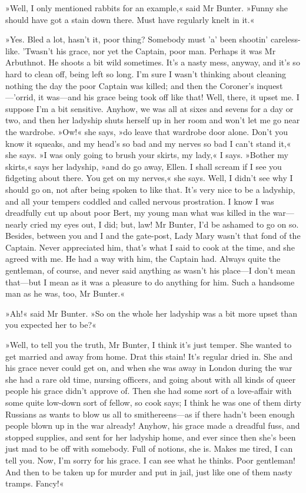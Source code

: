 »Well, I only mentioned rabbits for an example,« said Mr Bunter.  »Funny she should have got a stain down there. Must have regularly knelt in it.«

»Yes. Bled a lot, hasn't it, poor thing? Somebody must 'a' been shootin' careless-like. 'Twasn't his grace, nor yet the Captain, poor man. Perhaps it was Mr Arbuthnot. He shoots a bit wild sometimes.  It's a nasty mess, anyway, and it's so hard to clean off, being left so long. I'm sure I wasn't thinking about cleaning nothing the day the poor Captain was killed; and then the Coroner's inquest—'orrid, it was—and his grace being took off like that! Well, there, it upset me.  I suppose I'm a bit sensitive. Anyhow, we was all at sixes and sevens for a day or two, and then her ladyship shuts herself up in her room and won't let me go near the wardrobe. »Ow!« she says, »do leave that wardrobe door alone. Don't you know it squeaks, and my head's so bad and my nerves so bad I can't stand it,« she says. »I was only going to brush your skirts, my lady,« I says. »Bother my skirts,« says her ladyship, »and do go away, Ellen. I shall scream if I see you fidgeting about there. You get on my nerves,« she says. Well, I didn't see why I should go on, not after being spoken to like that. It's very nice to be a ladyship, and all your tempers coddled and called nervous prostration. I know I was dreadfully cut up about poor Bert, my young man what was killed in the war—nearly cried my eyes out, I did; but, law! Mr Bunter, I'd be ashamed to go on so. Besides, between you and I and the gate-post, Lady Mary wasn't that fond of the Captain. Never appreciated him, that's what I said to cook at the time, and she agreed with me. He had a way with him, the Captain had. Always quite the gentleman, of course, and never said anything as wasn't his place—I don't mean that—but I mean as it was a pleasure to do anything for him. Such a handsome man as he was, too, Mr Bunter.«

»Ah!« said Mr Bunter. »So on the whole her ladyship was a bit more upset than you expected her to be?«

»Well, to tell you the truth, Mr Bunter, I think it's just temper. She wanted to get married and away from home. Drat this stain! It's regular dried in. She and his grace never could get on, and when she was away in London during the war she had a rare old time, nursing officers, and going about with all kinds of queer people his grace didn't approve of.  Then she had some sort of a love-affair with some quite low-down sort of fellow, so cook says; I think he was one of them dirty Russians as wants to blow us all to smithereens—as if there hadn't been enough people blown up in the war already! Anyhow, his grace made a dreadful fuss, and stopped supplies, and sent for her ladyship home, and ever since then she's been just mad to be off with somebody. Full of notions, she is. Makes me tired, I can tell you. Now, I'm sorry for his grace. I can see what he thinks. Poor gentleman! And then to be taken up for murder and put in jail, just like one of them nasty tramps.  Fancy!«

